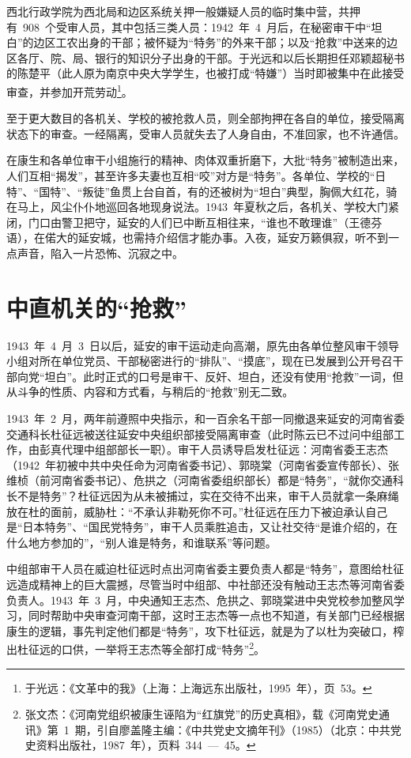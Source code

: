 西北行政学院为西北局和边区系统关押一般嫌疑人员的临时集中营，共押有~908~个受审人员，其中包括三类人员：1942~年~4~月后，在秘密审干中“坦白”的边区工农出身的干部；被怀疑为“特务”的外来干部；以及“抢救”中送来的边区各厅、院、局、银行的知识分子出身的干部。于光远和以后长期担任邓颖超秘书的陈楚平（此人原为南京中央大学学生，也被打成“特嫌”）当时即被集中在此接受审查，并参加开荒劳动\footnote{于光远：《文革中的我》（上海：上海远东出版社，1995~年），页~53。}。

至于更大数目的各机关、学校的被抢救人员，则全部拘押在各自的单位，接受隔离状态下的审查。一经隔离，受审人员就失去了人身自由，不准回家，也不许通信。

在康生和各单位审干小组施行的精神、肉体双重折磨下，大批“特务”被制造出来，人们互相“揭发”，甚至许多夫妻也互相“咬”对方是“特务”。各单位、学校的“日特”、“国特”、“叛徒”鱼贯上台自首，有的还被树为“坦白”典型，胸佩大红花，骑在马上，风尘仆仆地巡回各地现身说法。1943~年夏秋之后，各机关、学校大门紧闭，门口由警卫把守，延安的人们已中断互相往来，“谁也不敢理谁”（王德芬语），在偌大的延安城，也需持介绍信才能办事。入夜，延安万籁俱寂，听不到一点声音，陷入一片恐怖、沉寂之中。

\section{中直机关的“抢救”}

1943~年~4~月~3~日以后，延安的审干运动走向高潮，原先由各单位整风审干领导小组对所在单位党员、干部秘密进行的“排队”、“摸底”，现在已发展到公开号召干部向党“坦白”。此时正式的口号是审干、反奸、坦白，还没有使用“抢救”一词，但从斗争的性质、内容和方式看，与稍后的“抢救”别无二致。

1943~年~2~月，两年前遵照中央指示，和一百余名干部一同撤退来延安的河南省委交通科长杜征远被送往延安中央组织部接受隔离审查（此时陈云已不过问中组部工作，由彭真代理中组部部长一职）。审干人员诱导启发杜征远：河南省委王志杰（1942~年初被中共中央任命为河南省委书记）、郭晓棠（河南省委宣传部长）、张维桢（前河南省委书记）、危拱之（河南省委组织部长）都是“特务”，“就你交通科长不是特务”？杜征远因为从未被捕过，实在交待不出来，审干人员就拿一条麻绳放在杜的面前，威胁杜：“不承认非勒死你不可。”杜征远在压力下被迫承认自己是“日本特务”、“国民党特务”，审干人员乘胜追击，又让社交待“是谁介绍的，在什么地方参加的”，“别人谁是特务，和谁联系”等问题。

中组部审干人员在威迫杜征远时点出河南省委主要负责人都是“特务”，意图给杜征远造成精神上的巨大震撼，尽管当时中组部、中社部还没有触动王志杰等河南省委负责人。1943~年~3~月，中央通知王志杰、危拱之、郭晓棠进中央党校参加整风学习，同时帮助中央审查河南干部，这时王志杰等一点也不知道，有关部门已经根据康生的逻辑，事先判定他们都是“特务”，攻下杜征远，就是为了以杜为突破口，榨出杜征远的口供，一举将王志杰等全部打成“特务”\footnote{张文杰：《河南党组织被康生诬陷为“红旗党”的历史真相》，载《河南党史通讯》第~1~期，引自廖盖隆主编：《中共党史文摘年刊》（1985）（北京：中共党史资料出版社，1987~年），页料~344~—~45。}。

